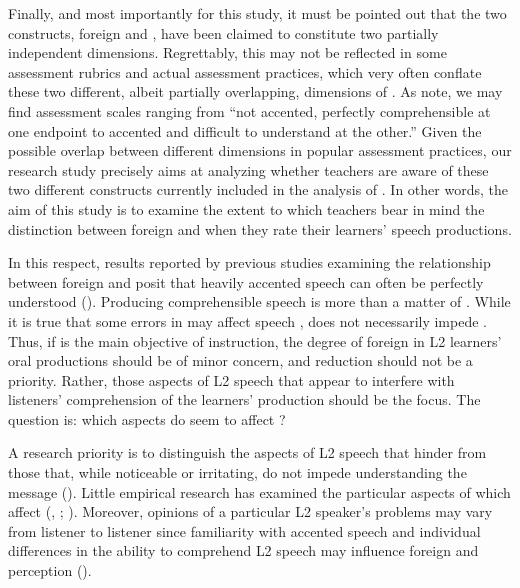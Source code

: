 \documentclass[output=paper]{langsci/langscibook}
\begin{document}
Finally, and most importantly for this study,  it must be pointed out that the two constructs, foreign  and , have been claimed to constitute two partially independent dimensions. Regrettably, this may not be reflected in some assessment rubrics and actual assessment practices, which very often conflate these two different, albeit partially overlapping, dimensions of . As \citet[92]{MunroDerwing1995} note, we may find  assessment scales ranging from “not accented, perfectly comprehensible at one endpoint to accented and difficult to understand at the other.” Given the possible overlap between different dimensions in popular assessment practices, our research study precisely aims at analyzing whether teachers are aware of these two different constructs currently included in the analysis of . In other words, the aim of this study is to examine the extent to which teachers bear in mind the distinction between foreign  and  when they rate their learners’ speech productions.

In this respect, results reported by previous studies examining the relationship between foreign  and  posit that heavily accented speech can often be perfectly understood (\citealt{MunroDerwing1995,MunroDerwing1999,DerwingMunro1997,GallardodelPuertoEtAl2007,Munro2008,Hayes-HarbWatzinger-Tharp2012}). Producing comprehensible speech is more than a matter of . While it is true that some errors in  may affect speech ,  does not necessarily impede . Thus, if  is the main objective of  instruction, the degree of foreign  in {L2} learners’ oral productions should be of minor concern, and  reduction should not be a priority. Rather, those aspects of {L2} speech that appear to interfere with listeners’ comprehension of the learners’ production should be the focus. The question is: which aspects do seem to affect ? 

A research priority is to distinguish the aspects of {L2} speech that hinder  from those that, while noticeable or irritating, do not impede understanding the message (\citealt{Munro2008,IsaacsTrofimovich2012}). Little empirical research has examined the particular aspects of  which affect  (\citealt{MunroDerwing1995}, \citealt{MunroDerwing1999}; \citealt{Zielinski2008,IsaacsTrofimovich2012,TrofimovichIsaacs2012}). Moreover, opinions of a particular {L2} speaker’s  problems may vary from listener to listener since familiarity with accented speech and individual differences in the ability to comprehend {L2} speech may influence foreign  and  perception (\citealt{GassVaronis1984,MunroDerwing1999}). 
\end{document}
